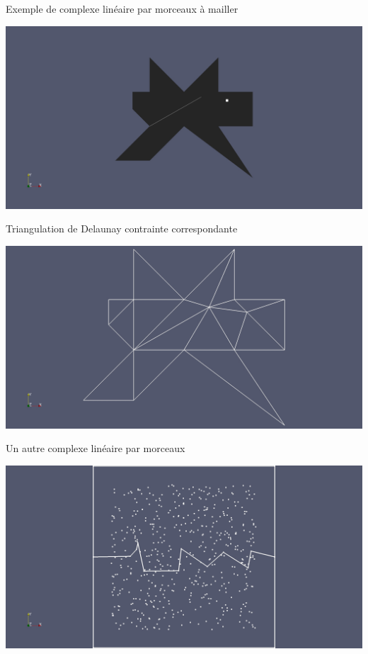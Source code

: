 \documentclass[aspectratio=169, 12pt, a4paper, hyperref={pdfauthor={Alexandre MARIN}, pdfkeywords={IFPEN, Delaunay, Voronoi, mesh generation}, colorlinks=true, linkcolor=purple, urlcolor=blue, citecolor=magenta}]{beamer}
\begin{document}
\begin{Energie}{\normalsize Exemple de complexe linéaire par morceaux à mailler}
\begin{center}
\includegraphics[scale=0.25, viewport=620 250 1550 950, clip]{odd_plc.jpg}
\end{center}
\end{Energie}

\begin{Energie}{\normalsize Triangulation de Delaunay contrainte correspondante}
\begin{center}
\includegraphics[scale=0.2, viewport=600 250 1750 1129, clip]{odd_cdt.jpg}
\end{center}
\end{Energie}

\begin{Energie}{\normalsize Un autre complexe linéaire par morceaux}
\begin{center}\vspace{-1cm}
\includegraphics[scale=0.18, viewport=500 0 1700 1300, clip]{plc.jpg}
\end{center}
\end{Energie}
\end{document}
